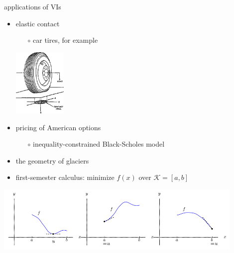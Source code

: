 \documentclass[svgnames,
               hyperref={colorlinks,citecolor=DeepPink4,linkcolor=FireBrick,urlcolor=Maroon},
               usepdftitle=false]  %
               {beamer}
\begin{document}
\begin{frame}{applications of VIs}

\begin{itemize}
\item elastic contact
    \begin{itemize}
    \item[$\circ$] car tires, for example
    \end{itemize}

\vspace{-10mm}
\hfill \includegraphics[width=0.2\textwidth]{figs/tirecontact.png}

\vspace{-20mm}
\item pricing of American options
    \begin{itemize}
    \item[$\circ$] inequality-constrained Black-Scholes model
    \end{itemize}

\vspace{1.5mm}
\item the geometry of glaciers %

\vspace{3mm}
\item first-semester calculus: \quad minimize $f(x)$ over $\mathcal{K} = [a,b]$
\end{itemize}

\begin{center}
\includegraphics[width=0.9\textwidth]{../talk-oxford/images/calcone.png}
\end{center}
\end{frame}


\end{document}
